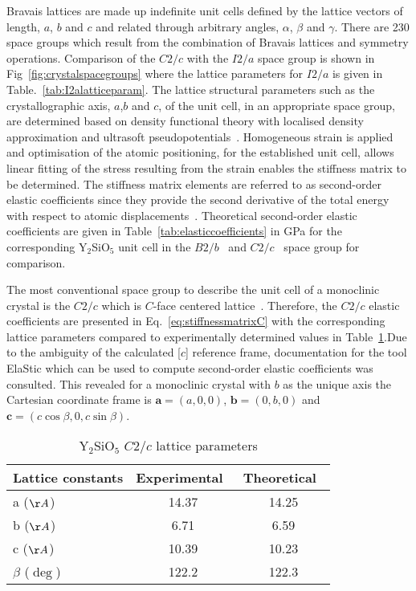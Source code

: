 Bravais lattices are made up indefinite unit cells defined by the lattice vectors of length, $a$, $b$ and $c$ and related through arbitrary angles, $\alpha$, $\beta$ and $\gamma$. There are 230 space groups which result from the combination of Bravais lattices and symmetry operations. Comparison of the $C2/c$ with the $I2/a$ space group is shown in Fig~\ref{fig:crystalspacegroups} where the lattice parameters for $I2/a$ is given in Table.~\ref{tab:I2alatticeparam}. The lattice structural parameters such as the crystallographic axis, $a$,$b$ and $c$, of the unit cell, in an appropriate space group, are determined based on density functional theory with localised density approximation and ultrasoft pseudopotentials~\citep{0953-8984-13-2-302}. Homogeneous strain is applied and optimisation of the atomic positioning, for the established unit cell, allows linear fitting of the stress resulting from the strain enables the stiffness matrix to be determined. The stiffness matrix elements are referred to as second-order elastic coefficients since they provide the second derivative of the total energy with respect to atomic displacements~\citep{doi:10.1111/jace.12764}. Theoretical second-order elastic coefficients are given in Table~\ref{tab:elasticcoefficients} in GPa for the corresponding Y$_{2}$SiO$_{5}$ unit cell in the $B2/b$~\citep{doi:10.1111/jace.12764} and $C2/c$~\citep{Ceramics} space group for comparison. 

The most conventional space group to describe the unit cell of a monoclinic crystal is the $C2/c$ which is $C$-face centered lattice~\citep{conventionalcells}. Therefore, the $C2/c$ elastic coefficients are presented in Eq.~\ref{eq:stiffnessmatrixC} with the corresponding lattice parameters compared to experimentally determined values in Table~\ref{tab:latticeparam}.Due to the ambiguity of the calculated [$c$] reference frame, documentation for the tool ElaStic\citep{ElaStic} which can be used to compute second-order elastic coefficients was consulted. This revealed for a monoclinic crystal with $b$ as the unique axis the Cartesian coordinate frame is $\textbf{a}=(a,0,0)$, $\textbf{b}=(0,b,0)$ and $\textbf{c}=(c \cos{\beta},0,c \sin{\beta})$. 

\begin{table}[h]
 \begin{center}
  \caption{Y$_{2}$SiO$_{5}$ $C2/c$ lattice parameters}
  \label{tab:latticeparam}
  \begin{tabular}{l | c c}
  \hline
  Lattice constants & Experimental~\citep{Cong:ko5080} & Theoretical~\citep{Ceramics} \\
  \hline
  a ($\AA$) & 14.37 & 14.25 \\
  b ($\AA$) & 6.71 & 6.59 \\
  c ($\AA$) & 10.39 & 10.23 \\
  $\beta$ ($\deg$) & 122.2 & 122.3 \\
  \hline
    \end{tabular}
  \end{center}
\end{table}





